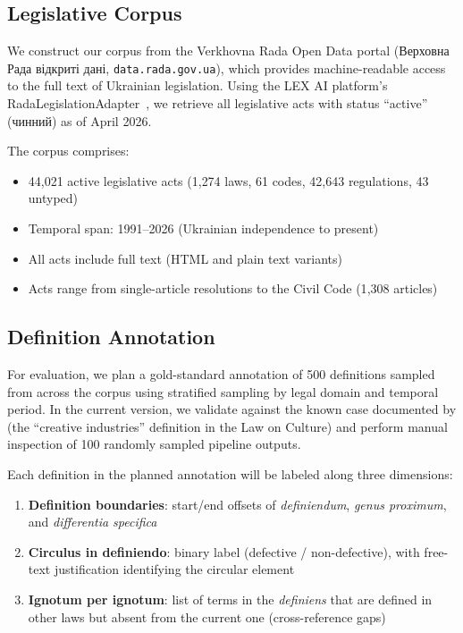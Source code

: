 \documentclass[11pt]{article}
\begin{document}
\subsection{Legislative Corpus}
\label{sec:corpus}

We construct our corpus from the Verkhovna Rada Open Data portal (\foreignlanguage{ukrainian}{Верховна Рада відкриті дані}, \texttt{data.rada.gov.ua}), which provides machine-readable access to the full text of Ukrainian legislation.
Using the LEX AI platform's RadaLegislationAdapter~\citep{ovcharov2026tokenizer}, we retrieve all legislative acts with status ``active'' (\foreignlanguage{ukrainian}{чинний}) as of April 2026.

The corpus comprises:

\begin{itemize}[nosep,leftmargin=*]
  \item 44{,}021 active legislative acts (1{,}274 laws, 61 codes, 42{,}643 regulations, 43 untyped)
  \item Temporal span: 1991--2026 (Ukrainian independence to present)
  \item All acts include full text (HTML and plain text variants)
  \item Acts range from single-article resolutions to the Civil Code (1{,}308 articles)
\end{itemize}

\subsection{Definition Annotation}
\label{sec:annotation}

For evaluation, we plan a gold-standard annotation of 500 definitions sampled from across the corpus using stratified sampling by legal domain and temporal period.
In the current version, we validate against the known case documented by \citet{kyrychenko2026creative} (the ``creative industries'' definition in the Law on Culture) and perform manual inspection of 100 randomly sampled pipeline outputs.

Each definition in the planned annotation will be labeled along three dimensions:

\begin{enumerate}[nosep,leftmargin=*]
  \item \textbf{Definition boundaries}: start/end offsets of \emph{definiendum}, \emph{genus proximum}, and \emph{differentia specifica}
  \item \textbf{Circulus in definiendo}: binary label (defective / non-defective), with free-text justification identifying the circular element
  \item \textbf{Ignotum per ignotum}: list of terms in the \emph{definiens} that are defined in other laws but absent from the current one (cross-reference gaps)
\end{enumerate}
\end{document}
